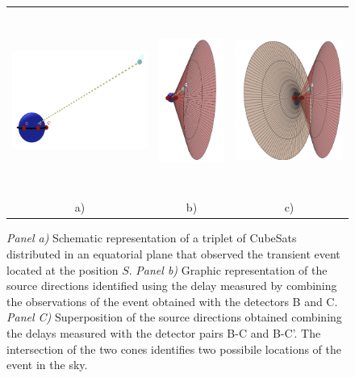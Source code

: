 \documentclass[]{spie}  %
\begin{document}
\begin{figure}
\begin{center}
\begin{tabular}{ccc}
\includegraphics[height=5cm]{trinag_fig1} &
\includegraphics[height=6cm]{triang_fig2} &
\includegraphics[height=6cm]{triang_fig3} \\
a) & b) & c)\\
\end{tabular}
\end{center}
\caption[example] 
{ \label{fig:triangulation2} 
\emph{Panel a)} Schematic representation of a triplet of CubeSats distributed in an equatorial plane that observed the transient event located at the position $S$. \emph{Panel b)} Graphic representation of the source directions identified using the delay measured by combining the observations of the event obtained with the detectors B and C. \emph{Panel C)} Superposition of the source directions obtained combining the delays measured with the detector pairs B-C and B-C'. The intersection of the two cones identifies two possibile locations of the event in the sky.}
\end{figure}
\end{document}
